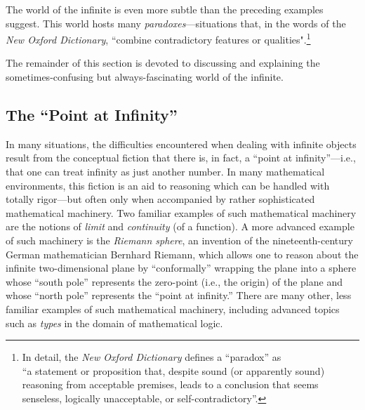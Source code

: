 \medskip

The world of the infinite is even more subtle than the preceding examples suggest.  This world hosts many {\em paradoxes}---situations that, in the words of the {\it New Oxford Dictionary}, ``combine contradictory features or qualities".\footnote{In detail, the {\it New Oxford Dictionary} defines a ``paradox'' as \\
``a statement or proposition that, despite sound (or apparently sound) reasoning from acceptable premises, leads to a conclusion that seems senseless, logically unacceptable, or self-contradictory''.}

\medskip

The remainder of this section is devoted to discussing and explaining the sometimes-confusing but always-fascinating world of the infinite.

\subsection{The ``Point at Infinity''}
\label{sec:point-at-infinity}

   
In many situations, the difficulties encountered when dealing with infinite objects result from the conceptual fiction that there is, in fact, a ``point at infinity''---i.e., that one can treat infinity as just
another number.  In many mathematical environments, this fiction is an aid to reasoning which can be handled with totally rigor---but often only when accompanied by rather sophisticated mathematical machinery.  Two familiar examples of such mathematical machinery are the notions
of  {\it limit} and {\it continuity} (of a function).  A more advanced example of such machinery is the {\it Riemann sphere}, an invention of the nineteenth-century German mathematician Bernhard Riemann, which allows one to reason about the infinite two-dimensional plane by ``conformally'' wrapping the plane into a sphere whose ``south pole'' represents the zero-point (i.e., the origin) of the plane and whose ``north pole'' represents the ``point at infinity.''  There are many other, less familiar examples of such mathematical machinery, including advanced topics such as {\it types} in the domain of mathematical logic.

\medskip

